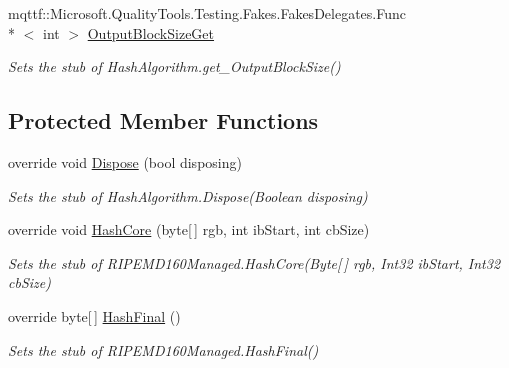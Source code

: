 \begin{DoxyCompactItemize}
mqttf\-::\-Microsoft.\-Quality\-Tools.\-Testing.\-Fakes.\-Fakes\-Delegates.\-Func\\*
$<$ int $>$ \hyperlink{class_system_1_1_security_1_1_cryptography_1_1_fakes_1_1_stub_r_i_p_e_m_d160_managed_a9f4213603e0d32386adf327a4d079f29}{Output\-Block\-Size\-Get}
\begin{DoxyCompactList}\small\item\em Sets the stub of Hash\-Algorithm.\-get\-\_\-\-Output\-Block\-Size()\end{DoxyCompactList}\end{DoxyCompactItemize}
\subsection*{Protected Member Functions}
\begin{DoxyCompactItemize}
\item 
override void \hyperlink{class_system_1_1_security_1_1_cryptography_1_1_fakes_1_1_stub_r_i_p_e_m_d160_managed_a6ec3dbc43ea5c327deaca60852b07eaa}{Dispose} (bool disposing)
\begin{DoxyCompactList}\small\item\em Sets the stub of Hash\-Algorithm.\-Dispose(\-Boolean disposing)\end{DoxyCompactList}\item 
override void \hyperlink{class_system_1_1_security_1_1_cryptography_1_1_fakes_1_1_stub_r_i_p_e_m_d160_managed_a34769e83a02906ce0c2f9a493d54e339}{Hash\-Core} (byte\mbox{[}$\,$\mbox{]} rgb, int ib\-Start, int cb\-Size)
\begin{DoxyCompactList}\small\item\em Sets the stub of R\-I\-P\-E\-M\-D160\-Managed.\-Hash\-Core(\-Byte\mbox{[}$\,$\mbox{]} rgb, Int32 ib\-Start, Int32 cb\-Size)\end{DoxyCompactList}\item 
override byte\mbox{[}$\,$\mbox{]} \hyperlink{class_system_1_1_security_1_1_cryptography_1_1_fakes_1_1_stub_r_i_p_e_m_d160_managed_a0ce0f8c93b2b0187f66412fe894a9114}{Hash\-Final} ()
\begin{DoxyCompactList}\small\item\em Sets the stub of R\-I\-P\-E\-M\-D160\-Managed.\-Hash\-Final()\end{DoxyCompactList}\end{DoxyCompactItemize}
